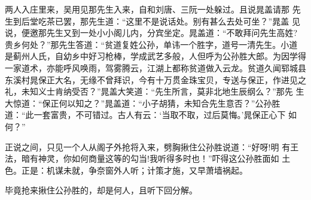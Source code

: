 两人入庄里来，吴用见那先生入来，自和刘唐、三阮一处躲过。且说晁盖请那
先生到后堂吃茶已罢，那先生道：“这里不是说话处。别有甚么去处可坐？”晁盖
见说，便邀那先生又到一处小小阁儿内，分宾坐定。晁盖道：“不敢拜问先生高姓?
贵乡何处？”那先生答道：“贫道复姓公孙，单讳一个胜字，道号一清先生。小道
是蓟州人氏，自幼乡中好习枪棒，学成武艺多般，人但呼为公孙胜大郎。为因学得
一家道术，亦能呼风唤雨，驾雾腾云，江湖上都称贫道做入云龙。贫道久闻郓城县
东溪村晁保正大名，无缘不曾拜识，今有十万贯金珠宝贝，专送与保正，作进见之
礼，未知义士肯纳受否？”晁盖大笑道：“先生所言，莫非北地生辰纲么？”那先
生大惊道：“保正何以知之？”晁盖道：“小子胡猜，未知合先生意否？”公孙胜
道：“此一套富贵，不可错过。古人有云：‘当取不取，过后莫悔。’晁保正心下
如何？”

正说之间，只见一个人从阁子外抢将入来，劈胸揪住公孙胜说道：“好呀!明
有王法，暗有神灵，你如何商量这等的勾当!我听得多时也！”吓得这公孙胜面如
土色。正是：机谋未就，争奈窗外人听；计策才施，又早萧墙祸起。

毕竟抢来揪住公孙胜的，却是何人，且听下回分解。